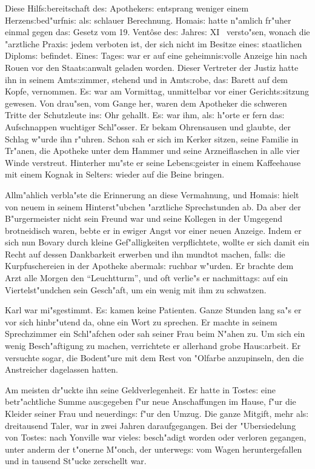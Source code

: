 \documentclass[oneside,12pt]{book}
\newenvironment{antiqua}{\normalfont}{}%
\newcommand{\s}{s:}%
\begin{document}
Diese Hilf{\s}bereitschaft de{\s} Apotheker{\s} entsprang weniger
einem Herzen{\s}bed"urfni{\s} al{\s} schlauer Berechnung.
Homai{\s} hatte n"amlich fr"uher einmal gegen da{\s} Gesetz vom
19. Vent\^ose de{\s} Jahre{\s} \begin{antiqua}XI\end{antiqua}~
versto"sen, wonach die "arztliche Praxi{\s} jedem verboten ist,
der sich nicht im Besitze eine{\s} staatlichen Diplom{\s}
befindet. Eine{\s} Tage{\s} war er auf eine geheimni{\s}volle
Anzeige hin nach Rouen vor den Staat{\s}anwalt geladen worden.
Dieser Vertreter der Justiz hatte ihn in seinem Amt{\s}zimmer,
stehend und in Amt{\s}robe, da{\s} Barett auf dem Kopfe,
vernommen. E{\s} war am Vormittag, unmittelbar vor einer
Gericht{\s}sitzung gewesen. Von drau"sen, vom Gange her, waren dem
Apotheker die schweren Tritte der Schutzleute in{\s} Ohr gehallt.
E{\s} war ihm, al{\s} h"orte er fern da{\s} Aufschnappen wuchtiger
Schl"osser. Er bekam Ohrensausen und glaubte, der Schlag w"urde
ihn r"uhren. Schon sah er sich im Kerker sitzen, seine Familie in
Tr"anen, die Apotheke unter dem Hammer und seine Arzneiflaschen in
alle vier Winde verstreut. Hinterher mu"ste er seine
Leben{\s}geister in einem Kaffeehause mit einem Kognak in
Selter{\s} wieder auf die Beine bringen.

Allm"ahlich verbla"ste die Erinnerung an diese Vermahnung, und
Homai{\s} hielt von neuem in seinem Hinterst"ubchen "arztliche
Sprechstunden ab. Da aber der B"urgermeister nicht sein Freund war
und seine Kollegen in der Umgegend brotneidisch waren, bebte er in
ewiger Angst vor einer neuen Anzeige. Indem er sich nun Bovary
durch kleine Gef"alligkeiten verpflichtete, wollte er sich damit
ein Recht auf dessen Dankbarkeit erwerben und ihn mundtot machen,
fall{\s} die Kurpfuschereien in der Apotheke abermal{\s} ruchbar
w"urden. Er brachte dem Arzt alle Morgen den "`Leuchtturm"', und
oft verlie"s er nachmittag{\s} auf ein Viertelst"undchen sein
Gesch"aft, um ein wenig mit ihm zu schwatzen.

Karl war mi"sgestimmt. E{\s} kamen keine Patienten. Ganze Stunden
lang sa"s er vor sich hinbr"utend da, ohne ein Wort zu sprechen.
Er machte in seinem Sprechzimmer ein Schl"afchen oder sah seiner
Frau beim N"ahen zu. Um sich ein wenig Besch"aftigung zu machen,
verrichtete er allerhand grobe Hau{\s}arbeit. Er versuchte sogar,
die Bodent"ure mit dem Rest von "Olfarbe anzupinseln, den die
Anstreicher dagelassen hatten.

Am meisten dr"uckte ihn seine Geldverlegenheit. Er hatte in
Toste{\s} eine betr"achtliche Summe au{\s}gegeben f"ur neue
Anschaffungen im Hause, f"ur die Kleider seiner Frau und
neuerding{\s} f"ur den Umzug. Die ganze Mitgift, mehr al{\s}
dreitausend Taler, war in zwei Jahren daraufgegangen. Bei der
"Ubersiedelung von Toste{\s} nach Yonville war viele{\s}
besch"adigt worden oder verloren gegangen, unter anderm der
t"onerne M"onch, der unterweg{\s} vom Wagen heruntergefallen und
in tausend St"ucke zerschellt war.
\end{document}
